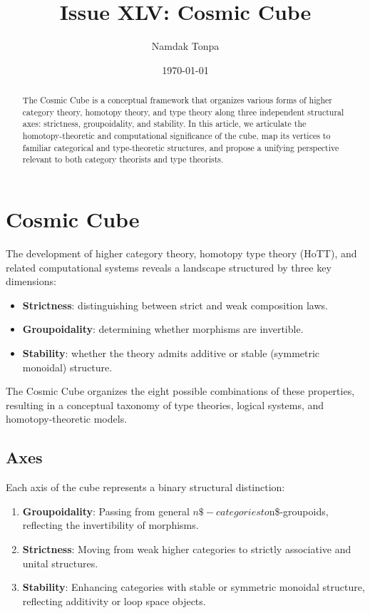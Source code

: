 \documentclass{article}
\begin{document}
\title{Issue XLV: Cosmic Cube}
\author{Namdak Tonpa}
\date{\today}

\maketitle

\begin{abstract}
The Cosmic Cube is a conceptual framework that organizes various forms of higher category theory, homotopy theory, and type theory along three independent structural axes: strictness, groupoidality, and stability. In this article, we articulate the homotopy-theoretic and computational significance of the cube, map its vertices to familiar categorical and type-theoretic structures, and propose a unifying perspective relevant to both category theorists and type theorists.
\end{abstract}

\ifincludeTOC
  \tableofcontents
\fi

\section{Cosmic Cube}
The development of higher category theory, homotopy type theory (HoTT), and related computational systems reveals a landscape structured by three key dimensions:

\begin{itemize}
\item \textbf{Strictness}: distinguishing between strict and weak composition laws.
\item \textbf{Groupoidality}: determining whether morphisms are invertible.
\item \textbf{Stability}: whether the theory admits additive or stable (symmetric monoidal) structure.
\end{itemize}

The Cosmic Cube organizes the eight possible combinations of these properties, resulting in a conceptual taxonomy of type theories, logical systems, and homotopy-theoretic models.

\subsection{Axes}

Each axis of the cube represents a binary structural distinction:

\begin{enumerate}
\item \textbf{Groupoidality}: Passing from general $n\$-categories to $n\$-groupoids, reflecting the invertibility of morphisms.
\item \textbf{Strictness}: Moving from weak higher categories to strictly associative and unital structures.
\item \textbf{Stability}: Enhancing categories with stable or symmetric monoidal structure, reflecting additivity or loop space objects.
\end{enumerate}
\end{document}
